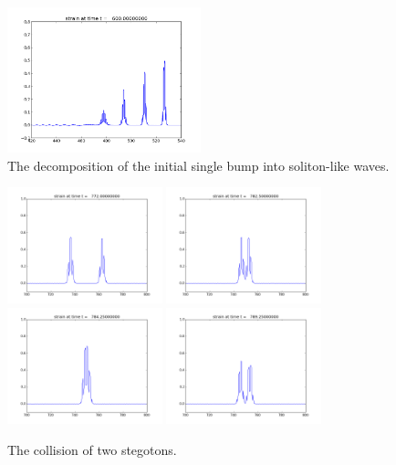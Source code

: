 \documentclass{article}
\begin{document}
\begin{figure}
  \includegraphics[width=0.5\textwidth]{frame0060fig1.png}
  \caption{The decomposition of the initial single bump into soliton-like waves.}
  \label{travelw}
\end{figure}

\begin{figure}
  \center
  \includegraphics[width=0.4\textwidth]{stegoton1.png}
  \includegraphics[width=0.4\textwidth]{stegoton2.png}\\
  \includegraphics[width=0.4\textwidth]{stegoton3.png}
  \includegraphics[width=0.4\textwidth]{stegoton4.png}
  \caption{The collision of two stegotons.}
  \label{collision}
\end{figure}
\end{document}
